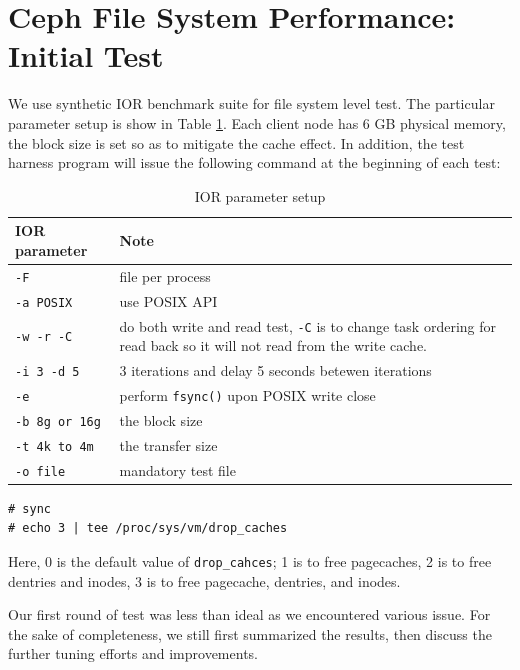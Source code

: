 \documentclass{article}
\begin{document}
\section{Ceph File System Performance: Initial Test}

We use synthetic IOR benchmark suite for file system level test. The particular
parameter setup is show in Table \ref{tbl:ior}. Each client node has 6 GB
physical memory, the block size is set so as to mitigate the cache effect. In
addition, the test harness program will issue the following command at the
beginning of each test:




\begin{table}[tb]
\centering
\begin{tabular}{p{1.5in} | p{3in}}
    \toprule
    IOR parameter & Note \\ \midrule
    \verb!-F! & file per process \\ \midrule
    \verb!-a POSIX! & use POSIX API \\ \midrule
    \verb!-w -r -C! & do both write and read test, \verb!-C! is to change task
        ordering for read back so it will not read from the write cache. \\ \midrule
    \verb!-i 3 -d 5! & 3 iterations and delay 5 seconds betewen iterations \\
    \midrule  
    \verb!-e! & perform \verb!fsync()! upon POSIX write close \\ \midrule
    \verb!-b 8g or 16g! & the block size \\ \midrule
    \verb!-t 4k to 4m! & the transfer size \\ \midrule
    \verb!-o file! & mandatory test file  \\    
    \bottomrule
\end{tabular}
\caption{IOR parameter setup}
\label{tbl:ior}
\end{table}


\begin{Verbatim}
# sync
# echo 3 | tee /proc/sys/vm/drop_caches
\end{Verbatim}


Here, 0 is the default value of \verb!drop_cahces!; 1 is to free pagecaches, 2
is to free dentries and inodes, 3 is to free pagecache, dentries, and inodes.


Our first round of test was less than ideal as we encountered various issue. For
the sake of completeness, we still first summarized the results, then discuss
the further tuning efforts and improvements.
\end{document}
